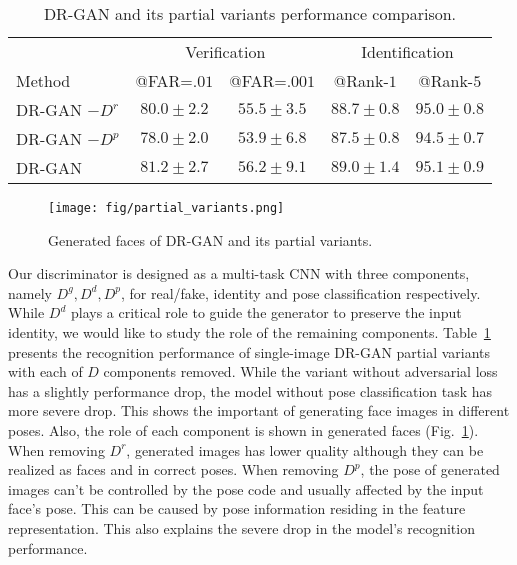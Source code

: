 \documentclass[10pt,journal,compsoc]{IEEEtran}
\begin{document}
\begin{table}[t!]
\caption{\small{DR-GAN and its partial variants performance comparison.}}
\vspace{-3mm}
\small
\begin{center}
\begin{tabular}{@{\hskip 1.5mm}l@{\hskip 1.5mm}c@{\hskip 1.5mm}c@{\hskip 1.5mm}c@{\hskip 1.5mm}c@{\hskip .5mm}}
\toprule
& \multicolumn{2}{c}{Verification} & \multicolumn{2}{c}{Identification} \\ \cmidrule(r){2-3} \cmidrule(r){4-5}
Method & @FAR=$.01$ & @FAR=$.001$ & @Rank-$1$ & @Rank-$5$ \\ \midrule
DR-GAN $- D^r$ & $80.0\pm2.2$ & $55.5\pm3.5$ & $88.7\pm0.8$ & $95.0\pm0.8$ \\
DR-GAN $- D^p$ & $78.0\pm2.0$ & $53.9\pm6.8$ & $87.5\pm0.8$ & $94.5\pm0.7$ \\
DR-GAN         & $81.2\pm2.7$ & $56.2\pm9.1$ & $89.0\pm1.4$ & $95.1\pm0.9$ \\
 \bottomrule
\end{tabular}
\end{center}
\eqnvspace
\label{tab:ijb-a_D_components}
\vspace{-2mm}
\end{table}\begin{figure}[t!]
\begin{center}
\texttt{[image: fig/partial\_variants.png]}
\end{center}
\vspace{-3mm}
\caption{Generated faces of DR-GAN and its partial variants.}
\label{fig:ijb-a_D_components_vis}
\figvspace
\end{figure}\label{sec:ablation}\label{sec:ablation_D_components}
Our discriminator is designed as a multi-task CNN with three components, namely $D^g, D^d, D^p$, for real/fake, identity and pose classification respectively. 
While $D^d$ plays a critical role to guide the generator to preserve the input identity, we would like to study the role of the remaining components.
Table~\ref{tab:ijb-a_D_components} presents the recognition performance of single-image DR-GAN partial variants with each of $D$ components removed. 
While the variant without adversarial loss has a slightly performance drop, the model without pose classification task has more severe drop. 
This shows the important of generating face images in different poses. 
Also, the role of each component is shown in generated faces (Fig.~\ref{fig:ijb-a_D_components_vis}). 
When removing $D^r$, generated images has lower quality although they can be realized as faces and in correct poses. 
When removing $D^p$, the pose of generated images can't be controlled by the pose code and usually affected by the input face's pose. 
This can be caused by pose information residing in the feature representation. 
This also explains the severe drop in the model's recognition performance.
\end{document}
